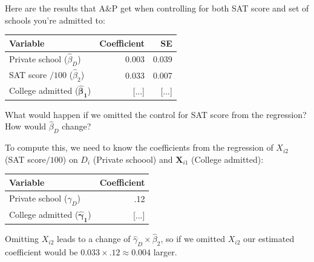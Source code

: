 \documentclass[11pt,english,handout]{beamer}
\newenvironment{wideitemize}{\itemize\addtolength{\itemsep}{10pt}}{\enditemize}
\begin{document}
\begin{frame}
	\begin{wideitemize}
	\item
	Here are the results that A\&P get when controlling for both SAT score and set of schools you're admitted to: \bigskip
	\begin{tabular}{lrr}
		Variable & Coefficient & SE \\ \hline
		Private school ($\hat\beta_D$) & 0.003 & 0.039 \\
		SAT score $/ 100$ ($\hat\beta_2$) & 0.033 & 0.007 \\
		College admitted ($\bm{\hat\beta_1}$) & [...] & [...]
	\end{tabular}

	\item
	What would happen if we omitted the control for SAT score from the regression? How would $\hat\beta_D$ change? 
	
	\pause
	\item
	To compute this, we need to know the coefficients from the regression of $X_{i2}$ (SAT score$/100$) on $D_i$ (Private schoool) and $\bm{X}_{i1}$ (College admitted):\\
	\pause
	\begin{tabular}{lr}
		Variable & Coefficient \\ \hline
		Private school ($\hat\gamma_D$) & .12 \\
		College admitted ($\bm{\hat\gamma_1}$) & [...]
	\end{tabular}

	\pause
	\item 
	Omitting $X_{i2}$ leads to a change of $\hat\gamma_D \times \hat\beta_2$, so if we omitted $X_{i2}$ our estimated coefficient would be \pause $0.033 \times .12 \approx 0.004$ larger.
	\end{wideitemize}
\end{frame}
\end{document}
